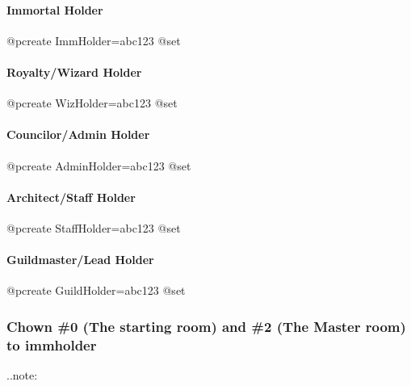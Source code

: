 \documentclass[letterpaper,10pt,english]{sphinxmanual}
\begin{document}
\paragraph{Immortal Holder}
\label{\detokenize{gettingstarted:immortal-holder}}
\sphinxAtStartPar
@pcreate ImmHolder=abc123
@set 


\paragraph{Royalty/Wizard Holder}
\label{\detokenize{gettingstarted:royalty-wizard-holder}}
\sphinxAtStartPar
@pcreate WizHolder=abc123
@set 


\paragraph{Councilor/Admin Holder}
\label{\detokenize{gettingstarted:councilor-admin-holder}}
\sphinxAtStartPar
@pcreate AdminHolder=abc123
@set 


\paragraph{Architect/Staff Holder}
\label{\detokenize{gettingstarted:architect-staff-holder}}
\sphinxAtStartPar
@pcreate StaffHolder=abc123
@set 


\paragraph{Guildmaster/Lead Holder}
\label{\detokenize{gettingstarted:guildmaster-lead-holder}}
\sphinxAtStartPar
@pcreate GuildHolder=abc123
@set 


\subsubsection{Chown \#0 (The starting room) and \#2 (The Master room) to immholder}
\label{\detokenize{gettingstarted:chown-0-the-starting-room-and-2-the-master-room-to-immholder}}
\sphinxAtStartPar
..note:

\begin{sphinxVerbatim}[commandchars=\\\{\}]
\end{sphinxVerbatim}
\end{document}
